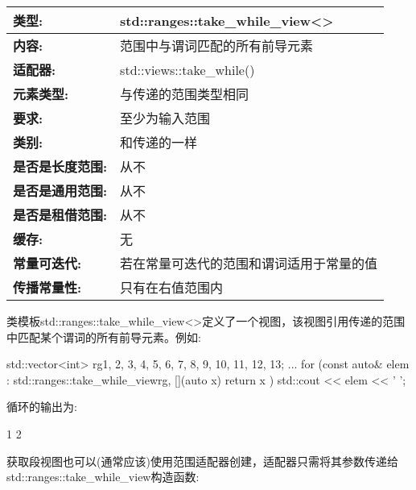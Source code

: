 \begin{longtable}[c]{|l|l|}
\hline
\textbf{类型:}                 & std::ranges::take\_while\_view\textless{}\textgreater{}        \\ \hline
\endfirsthead
%
\endhead
%
\textbf{内容:}              & 范围中与谓词匹配的所有前导元素         \\ \hline
\textbf{适配器:}           & std::views::take\_while() \\ \hline
\textbf{元素类型:}      & 与传递的范围类型相同 \\ \hline
\textbf{要求:}          & 至少为输入范围      \\ \hline
\textbf{类别:}          & 和传递的一样            \\ \hline
\textbf{是否是长度范围:}    & 从不                     \\ \hline
\textbf{是否是通用范围:}   & 从不                     \\ \hline
\textbf{是否是租借范围:} & 从不                     \\ \hline
\textbf{缓存:}            & 无                   \\ \hline
\textbf{常量可迭代:}       & 若在常量可迭代的范围和谓词适用于常量的值 \\ \hline
\textbf{传播常量性:} & 只有在右值范围内                                        \\ \hline
\end{longtable}

类模板std::ranges::take\_while\_view<>定义了一个视图，该视图引用传递的范围中匹配某个谓词的所有前导元素。例如:

\begin{cpp}
std::vector<int> rg{1, 2, 3, 4, 5, 6, 7, 8, 9, 10, 11, 12, 13};
...
for (const auto& elem : std::ranges::take_while_view{rg, [](auto x) {
									return x %
							}}) {
	std::cout << elem << ' ';
}
\end{cpp}

循环的输出为:

\begin{shell}
1 2
\end{shell}


获取段视图也可以(通常应该)使用范围适配器创建，适配器只需将其参数传递给std::ranges::take\_while\_view构造函数:

